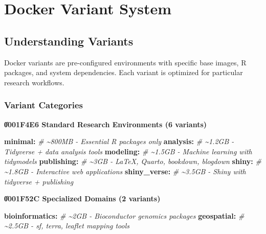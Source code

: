 \documentclass[
]{article}
\newenvironment{Shaded}{\begin{snugshade}}{\end{snugshade}}
\newcommand{\CommentTok}[1]{\textcolor[rgb]{0.56,0.35,0.01}{\textit{#1}}}
\newcommand{\FunctionTok}[1]{\textcolor[rgb]{0.13,0.29,0.53}{\textbf{#1}}}
\newcommand{\KeywordTok}[1]{\textcolor[rgb]{0.13,0.29,0.53}{\textbf{#1}}}
\begin{document}
\section{Docker Variant System}\label{docker-variant-system}

\subsection{Understanding Variants}\label{understanding-variants}

Docker variants are pre-configured environments with specific base
images, R packages, and system dependencies. Each variant is optimized
for particular research workflows.

\subsubsection{Variant Categories}\label{variant-categories}

\textbf{\U0001F4E6 Standard Research Environments (6 variants)}

\begin{Shaded}
\begin{Highlighting}[]
\FunctionTok{minimal}\KeywordTok{:}\CommentTok{          \# \textasciitilde{}800MB  {-} Essential R packages only}
\FunctionTok{analysis}\KeywordTok{:}\CommentTok{         \# \textasciitilde{}1.2GB  {-} Tidyverse + data analysis tools}
\FunctionTok{modeling}\KeywordTok{:}\CommentTok{         \# \textasciitilde{}1.5GB  {-} Machine learning with tidymodels}
\FunctionTok{publishing}\KeywordTok{:}\CommentTok{       \# \textasciitilde{}3GB    {-} LaTeX, Quarto, bookdown, blogdown}
\FunctionTok{shiny}\KeywordTok{:}\CommentTok{            \# \textasciitilde{}1.8GB  {-} Interactive web applications}
\FunctionTok{shiny\_verse}\KeywordTok{:}\CommentTok{      \# \textasciitilde{}3.5GB  {-} Shiny with tidyverse + publishing}
\end{Highlighting}
\end{Shaded}

\textbf{\U0001F52C Specialized Domains (2 variants)}

\begin{Shaded}
\begin{Highlighting}[]
\FunctionTok{bioinformatics}\KeywordTok{:}\CommentTok{   \# \textasciitilde{}2GB    {-} Bioconductor genomics packages}
\FunctionTok{geospatial}\KeywordTok{:}\CommentTok{       \# \textasciitilde{}2.5GB  {-} sf, terra, leaflet mapping tools}
\end{Highlighting}
\end{Shaded}
\end{document}

